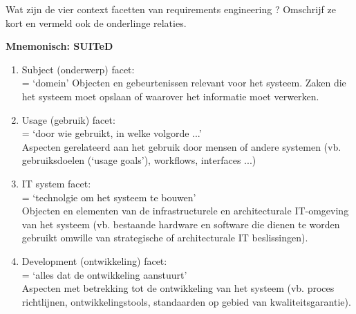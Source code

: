 \documentclass{article}
\begin{document}
\begin{quest}{}Wat zijn de vier context facetten van  requirements engineering ? Omschrijf ze kort en vermeld ook de onderlinge relaties.
\end{quest}
\textbf{Mnemonisch: SUITeD}
\begin{enumerate}
	\item Subject (onderwerp) facet: \\
	= `domein'
	Objecten en gebeurtenissen relevant voor het systeem. Zaken die het systeem moet opslaan of waarover het informatie moet verwerken.
	\item Usage (gebruik) facet: \\
	= `door wie gebruikt, in welke volgorde ...'\\
	Aspecten gerelateerd aan het gebruik door mensen of andere systemen (vb. gebruiksdoelen (`usage goals'), workflows, interfaces ...)
	\item IT system facet: \\
	= `technolgie om het systeem te bouwen'\\
	Objecten en elementen van de infrastructurele en architecturale IT-omgeving van het systeem (vb. bestaande hardware en software die dienen te worden gebruikt omwille van strategische of architecturale IT beslissingen).
	\item Development (ontwikkeling) facet: \\
	= `alles dat de ontwikkeling aanstuurt'\\
	Aspecten met betrekking tot de ontwikkeling van het systeem (vb. proces richtlijnen, ontwikkelingstools, standaarden op gebied van kwaliteitsgarantie).
\end{enumerate}
\end{document}
